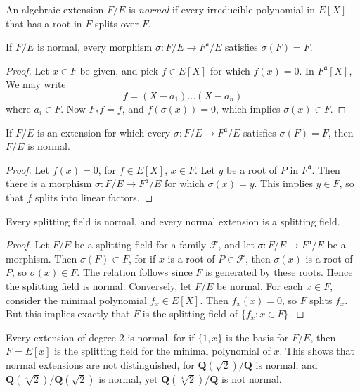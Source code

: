 An algebraic extension $F/E$ is \emph{normal} if every irreducible polynomial in $E[X]$ that has a root in $F$ splits over $F$.

\begin{lemma}
    If $F/E$ is normal, every morphism $\sigma:F/E \to F^{\mathfrak{a}}/E$ satisfies $\sigma(F) = F$.
\end{lemma}
\begin{proof}
    Let $x \in F$ be given, and pick $f \in E[X]$ for which $f(x) = 0$. In $F^{\mathfrak{a}}[X]$, We may write
    \[ f = (X - a_1) \dots (X - a_n) \]
    where $a_i \in F$. Now $F_* f = f$, and $f(\sigma(x)) = 0$, which implies $\sigma(x) \in F$.
\end{proof}

\begin{theorem}
    If $F/E$ is an extension for which every $\sigma:F/E \to F^{\mathfrak{a}}/E$ satisfies $\sigma(F) = F$, then $F/E$ is normal.
\end{theorem}
\begin{proof}
    Let $f(x) = 0$, for $f \in E[X]$, $x \in F$. Let $y$ be a root of $P$ in $F^{\mathfrak{a}}$. Then there is a morphism $\sigma: F/E \to F^{\mathfrak{a}}/E$ for which $\sigma(x) = y$. This implies $y \in F$, so that $f$ splits into linear factors.
\end{proof}

\begin{corollary}
    Every splitting field is normal, and every normal extension is a splitting field.
\end{corollary}
\begin{proof}
    Let $F/E$ be a splitting field for a family $\mathcal{F}$, and let $\sigma: F/E \to F^{\mathfrak{a}}/E$ be a morphism. Then $\sigma(F) \subset F$, for if $x$ is a root of $P \in \mathcal{F}$, then $\sigma(x)$ is a root of $P$, so $\sigma(x) \in F$. The relation follows since $F$ is generated by these roots. Hence the splitting field is normal. Conversely, let $F/E$ be normal. For each $x \in F$, consider the minimal polynomial $f_x \in E[X]$. Then $f_x(x) = 0$, so $F$ splits $f_x$. But this implies exactly that $F$ is the splitting field of $\{ f_x : x \in F \}$.
\end{proof}

\begin{example}
    Every extension of degree 2 is normal, for if $\{ 1, x \}$ is the basis for $F/E$, then $F = E[x]$ is the splitting field for the minimal polynomial of $x$. This shows that normal extensions are not distinguished, for $\mathbf{Q}(\sqrt{2})/\mathbf{Q}$ is normal, and $\mathbf{Q}(\sqrt[4]{2})/\mathbf{Q}(\sqrt{2})$ is normal, yet $\mathbf{Q}(\sqrt[4]{2})/\mathbf{Q}$ is not normal.
\end{example}

